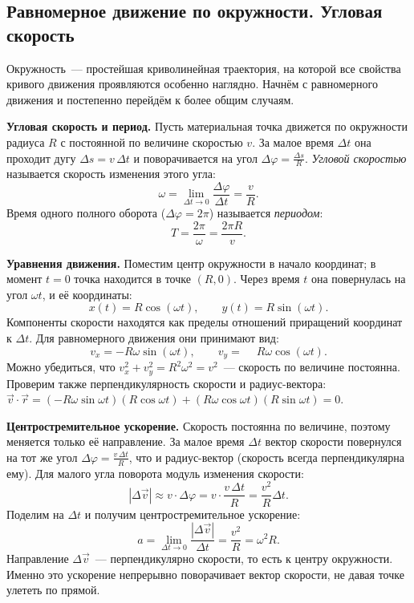 \documentclass[../main.tex]{subfiles}
\begin{document}
\subsection{Равномерное движение по окружности. Угловая скорость}

Окружность~--- простейшая криволинейная траектория, на которой все
свойства кривого движения проявляются особенно наглядно.
Начнём с равномерного движения и постепенно перейдём к более общим случаям.

\noindent\textbf{Угловая скорость и период.}
Пусть материальная точка движется по окружности радиуса $R$ с постоянной
по величине скоростью $v$. За малое время $\Delta t$ она проходит дугу
$\Delta s = v\,\Delta t$ и поворачивается на угол $\Delta\varphi = \frac{\Delta s}{R}$.
\textit{Угловой скоростью} называется скорость изменения этого угла:
\[
\omega = \lim_{\Delta t \to 0}\frac{\Delta\varphi}{\Delta t} = \frac{v}{R}.
\]
Время одного полного оборота ($\Delta\varphi = 2\pi$) называется \textit{периодом}:
\[
T = \frac{2\pi}{\omega} = \frac{2\pi R}{v}.
\]

\noindent\textbf{Уравнения движения.}
Поместим центр окружности в начало координат; в момент $t = 0$ точка
находится в точке $(R, 0)$.
Через время $t$ она повернулась на угол $\omega t$, и её координаты:
\[
x(t) = R\cos(\omega t), \qquad y(t) = R\sin(\omega t).
\]
Компоненты скорости находятся как пределы отношений приращений координат
к $\Delta t$. Для равномерного движения они принимают вид:
\[
v_x = -R\omega\sin(\omega t), \qquad
v_y = \phantom{-}R\omega\cos(\omega t).
\]
Можно убедиться, что $v_x^2 + v_y^2 = R^2\omega^2 = v^2$~--- скорость
по величине постоянна. Проверим также перпендикулярность скорости и радиус-вектора:
$\vec{v}\cdot\vec{r} = (-R\omega\sin\omega t)(R\cos\omega t)
+ (R\omega\cos\omega t)(R\sin\omega t) = 0$.

\noindent\textbf{Центростремительное ускорение.}
Скорость постоянна по величине, поэтому меняется только её направление.
За малое время $\Delta t$ вектор скорости повернулся на тот же угол
$\Delta\varphi = \frac{v\,\Delta t}{R}$, что и радиус-вектор
(скорость всегда перпендикулярна ему).
Для малого угла поворота модуль изменения скорости:
\[
|\Delta\vec{v}| \approx v \cdot \Delta\varphi = v \cdot \frac{v\,\Delta t}{R}
= \frac{v^2}{R}\Delta t.
\]
Поделим на $\Delta t$ и получим центростремительное ускорение:
\[
a = \lim_{\Delta t \to 0}\frac{|\Delta\vec{v}|}{\Delta t} = \frac{v^2}{R} = \omega^2 R.
\]
Направление $\Delta\vec{v}$~--- перпендикулярно скорости, то есть
к центру окружности. Именно это ускорение непрерывно поворачивает
вектор скорости, не давая точке улететь по прямой.
\end{document}
